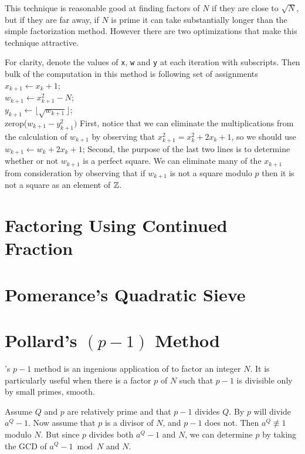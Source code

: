 This technique is reasonable good at finding factors of $N$ if they are
close to $\sqrt{N}$, but if they are far away, \eg{} if $N$ is prime it can
take substantially longer than the simple factorization method.  However
there are two optimizations that make this technique attractive.  

For clarity, denote the values of {\tt x}, {\tt w} and {\tt y} at each
iteration with subscripts.  Then bulk of the computation in this method is
following set of assignments
\begindsacode
$x_{k+1} \leftarrow x_{k}+1$; \\
$w_{k+1} \leftarrow x_{k+1}^{2} - N$; \\
$y_{k+1} \leftarrow \lfloor \sqrt{w_{k+1}} \rfloor$; \\
zerop($w_{k+1} - y_{k+1}^{2})$
\enddsacode
First, notice that we can eliminate the multiplications from the calculation
of $w_{k+1}$ by observing that $x_{k+1}^{2} = x_{k}^2 + 2 x_{k} +1$, so we
should use
\begindsacode
$w_{k+1} \leftarrow w_{k}+ 2 x_{k}+1$;
\enddsacode
Second, the purpose of the last two lines is to determine whether or not
$w_{k+1}$ is a perfect square.  We can eliminate many of the $x_{k+1}$ from
consideration by observing that if $w_{k+1}$ is not a square modulo $p$
then it is not a square as an element of $\mathbb{Z}$.


\section{Factoring Using Continued Fraction}

\section{Pomerance's Quadratic Sieve}

\section{Pollard's $(p - 1)$ Method}

{\Pollard}'s $p - 1$ method is an ingenious application of  to factor an integer $N$.  It is particularly useful
when there is a factor $p$ of $N$ such that $p - 1$ is divisible only
by small primes, \ie{} smooth.

Assume $Q$ and $p$ are relatively prime and that $p - 1$ divides $Q$.
By  $p$ will divide $a^Q - 1$.  Now
assume that $p$ is a divisor of $N$, and $p-1$ does not.  Then
$a^Q\not\equiv 1$ modulo $N$.  But since $p$ divides both $a^Q - 1$
and $N$, we can determine $p$ by taking the GCD of $a^Q - 1 \bmod {N}$
and $N$.

